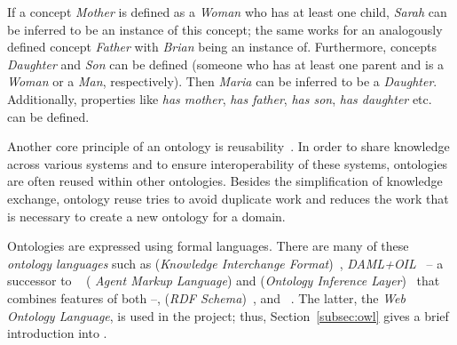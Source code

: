 If a concept \emph{Mother} is defined as a \emph{Woman} who has at least one child, \emph{Sarah} can be inferred to be an instance of this concept; the same works for an analogously defined concept \emph{Father} with \emph{Brian} being an instance of. Furthermore, concepts \emph{Daughter} and \emph{Son} can be defined (someone who has at least one parent and is a \emph{Woman} or a \emph{Man}, respectively). Then \emph{Maria} can be inferred to be a \emph{Daughter}. Additionally, properties like \emph{has mother}, \emph{has father}, \emph{has son}, \emph{has daughter} etc. can be defined.

\vspace{1em}

Another core principle of an ontology is reusability~\cite{reuse1,reuse2}. In order to share knowledge across various systems and to ensure interoperability of these systems, ontologies are often reused within other ontologies. Besides the simplification of knowledge exchange, ontology reuse tries to avoid duplicate work and reduces the work that is necessary to create a new ontology for a domain.

\vspace{1em}

Ontologies are expressed using formal languages. There are many of these \emph{ontology languages} such as  (\emph{Knowledge Interchange Format})~\cite{KIFReference}, \emph{DAML+OIL}~\cite{DAML+OIL} -- a successor to ~\cite{DAML} (\emph{ Agent Markup Language}) and  (\emph{Ontology Inference Layer})~\cite{OIL} that combines features of both --,  (\emph{RDF Schema})~\cite{RDFS}, and ~\cite{OWL}. The latter, the \emph{Web Ontology Language}, is used in the \smarthomeweather project; thus, Section~\ref{subsec:owl} gives a brief introduction into .

